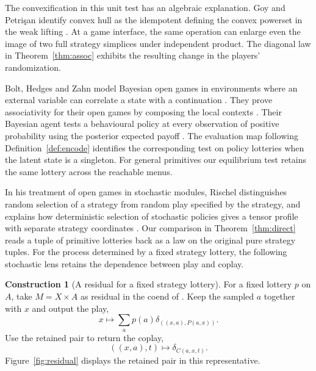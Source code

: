 \documentclass[11pt,a4paper]{article}
\theoremstyle{definition}
\newtheorem*{construction}{Construction}
\begin{document}
The convexification in this unit test has an algebraic explanation. Goy and Petri\c{s}an identify convex hull as the idempotent defining the convex powerset in the weak lifting \cite[Theorem~4.1]{goy}. At a game interface, the same operation can enlarge even the image of two full strategy simplices under independent product. The diagonal law in Theorem~\ref{thm:assoc} exhibits the resulting change in the players' randomization.

Bolt, Hedges and Zahn model Bayesian open games in environments where an external variable can correlate a state with a continuation \cite[Definition~3.5.2]{bolt}. They prove associativity for their open games by composing the local contexts \cite[Lemma~3.10.1]{bolt}. Their Bayesian agent tests a behavioural policy at every observation of positive probability using the posterior expected payoff \cite[Definition~4.4.1]{bolt}. The evaluation map following Definition~\ref{def:encode} identifies the corresponding test on policy lotteries when the latent state is a singleton. For general primitives our equilibrium test retains the same lottery across the reachable menus.

In his treatment of open games in stochastic modules, Rischel distinguishes random selection of a strategy from random play specified by the strategy, and explains how deterministic selection of stochastic policies gives a tensor profile with separate strategy coordinates \cite[Section~5.2, p.~78]{rischel}. Our comparison in Theorem~\ref{thm:direct} reads a tuple of primitive lotteries back as a law on the original pure strategy tuples. For the process determined by a fixed strategy lottery, the following stochastic lens retains the dependence between play and coplay.

\begin{construction}[A residual for a fixed strategy lottery]
    For a fixed lottery $p$ on $A$, take $M=X\times A$ as residual in the coend of \cite[Definition~3.3.1]{bolt}. Keep the sampled $a$ together with $x$ and output the play,
    \[
        x\longmapsto\sum_a p(a)\delta_{((x,a),P(a,x))}.
    \]
    Use the retained pair to return the coplay,
    \[
        ((x,a),t)\longmapsto\delta_{C(a,x,t)}.
    \]
    Figure~\ref{fig:residual} displays the retained pair in this representative.
\end{construction}
\end{document}
